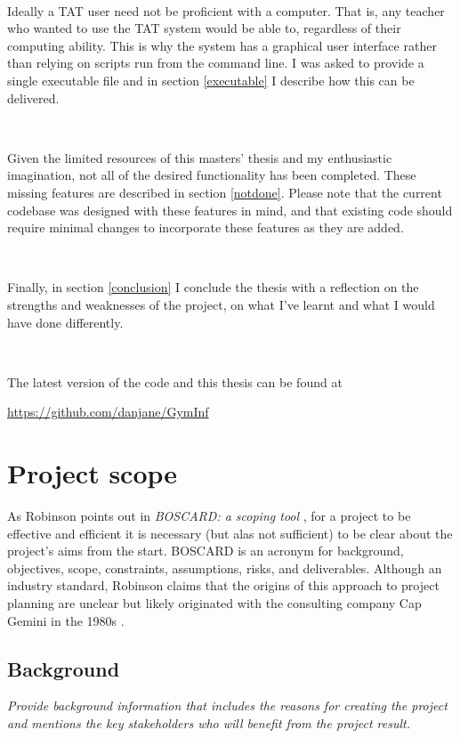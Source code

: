 \documentclass[10pt]{article}
\begin{document}
\

Ideally a TAT user need not be proficient with a computer. That is, any teacher who wanted to use the TAT system would be able to, regardless of their computing ability.  This is why the system has a graphical user interface rather than relying on scripts run from the command line. I was asked to provide a single executable file and in section \ref{executable} I describe how this can be delivered.

\

Given the limited resources of this masters' thesis and my enthusiastic imagination, not all of the desired functionality has been completed. These missing features are described in section \ref{notdone}. Please note that the current codebase was designed with these features in mind, and that existing code should require minimal changes to incorporate these features as they are added.

\

Finally, in section \ref{conclusion} I conclude the thesis with a reflection on the strengths and weaknesses of the project, on what I've learnt and what I would have done differently.

\

\begin{tcolorbox}
The latest version of the code and this thesis can be found at 
\begin{center} \url{https://github.com/danjane/GymInf} \end{center}
\end{tcolorbox}

\section{Project scope}

As Robinson points out in \emph{BOSCARD: a scoping tool} \cite{Rob19}, for a project to be effective and efficient it is necessary (but alas not sufficient) to be clear about the project's aims from the start. BOSCARD is an acronym for background, objectives, scope, constraints, assumptions, risks, and deliverables. Although an industry standard, Robinson claims that the origins of this approach to project planning are unclear but likely originated with the consulting company Cap Gemini in the 1980s \cite[p. 181]{Rob19}.

\subsection{Background}
\emph{Provide background information that includes the reasons for creating the project and mentions the key stakeholders who will benefit from the project result.}
\end{document}
